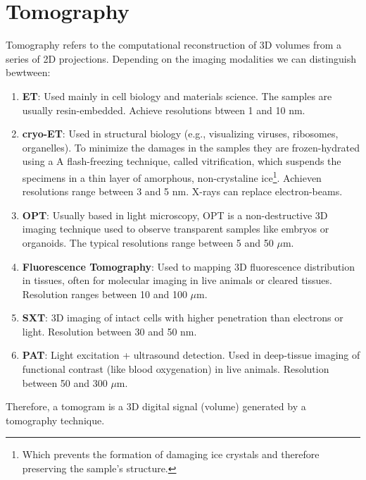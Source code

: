 
\section{Tomography}

Tomography refers to the computational reconstruction of 3D volumes
from a series of 2D projections. Depending on the imaging modalities
we can distinguish bewtween:
\begin{enumerate}
\item \textbf{\gls{ET}}: Used mainly in cell biology and materials
  science. The samples are usually resin-embedded. Achieve resolutions
  btween 1 and 10 nm.
\item \textbf{\gls{cryo-ET}}: Used in structural biology (e.g.,
  visualizing viruses, ribosomes, organelles). To minimize the damages
  in the samples they are frozen-hydrated using a A flash-freezing
  technique, called vitrification, which suspends the specimens in a
  thin layer of amorphous, non-crystaline ice\footnote{Which prevents
    the formation of damaging ice crystals and therefore preserving
    the sample's structure.}. Achieven resolutions range between 3 and
  5 nm. X-rays can replace electron-beams.
\item \textbf{\gls{OPT}}: Usually based in
  light microscopy, OPT is a non-destructive 3D imaging technique used
  to observe transparent samples like embryos or organoids. The
  typical resolutions range between 5 and 50 $\mu$m.
\item \textbf{Fluorescence Tomography}: Used to mapping 3D
  fluorescence distribution in tissues, often for molecular imaging in
  live animals or cleared tissues. Resolution ranges between 10 and
  100 $\mu$m.
\item \textbf{\gls{SXT}}: 3D imaging of intact cells with
  higher penetration than electrons or light. Resolution between 30
  and 50 nm.
\item \textbf{\gls{PAT}}: Light excitation + ultrasound
  detection. Used in deep-tissue imaging of functional contrast (like
  blood oxygenation) in live animals. Resolution between 50 and 300
  $\mu$m.
\end{enumerate}

Therefore, a tomogram is a 3D digital signal (volume) generated by a
tomography technique.


